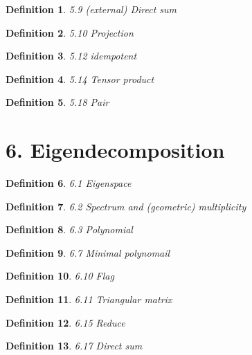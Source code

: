 \documentclass[12pt]{article}
\theoremstyle{plain}
\newtheorem{definition}{Definition}
\begin{document}
\begin{definition} 
  5.9 (external) Direct sum 
\end{definition}



\begin{definition} 
 5.10 Projection 
\end{definition}


\begin{definition} 
 5.12 idempotent 
\end{definition}


\begin{definition} 
 5.14 Tensor product 
\end{definition}


\begin{definition} 
 5.18 Pair  
\end{definition}


\section{6. Eigendecomposition}


\begin{definition} 
 6.1 Eigenspace 
\end{definition}



\begin{definition} 
  6.2 Spectrum and (geometric) multiplicity 
\end{definition}



\begin{definition} 
 6.3 Polynomial 
\end{definition}



\begin{definition} 
 6.7 Minimal polynomail
\end{definition}


\begin{definition} 
 6.10 Flag 
\end{definition}


\begin{definition} 
 6.11 Triangular matrix 
\end{definition}


\begin{definition} 
  6.15 Reduce
\end{definition}


\begin{definition} 
  6.17 Direct sum
\end{definition}
\end{document}
